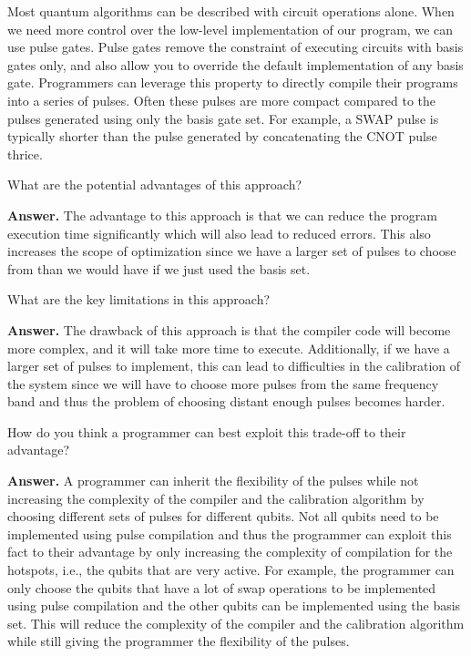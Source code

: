 Most quantum algorithms can be described with circuit operations alone. When we need more control over the low-level implementation of our program, we can use pulse gates. Pulse gates remove the constraint of executing circuits with basis gates only, and also allow you to override the default implementation of any basis gate. Programmers can leverage this property to directly compile their programs into a series of pulses. Often these pulses are more compact compared to the pulses generated using only the basis gate set. For example, a SWAP pulse is typically shorter than the pulse generated by concatenating the CNOT pulse thrice.

\tcbline{}

\begin{question}
    What are the potential advantages of this approach?
\end{question}
\textbf{Answer.} The advantage to this approach is that we can reduce the program execution time significantly which will also lead to reduced errors. This also increases the scope of optimization since we have a larger set of pulses to choose from than we would have if we just used the basis set.

\tcbline{}

\begin{question}
    What are the key limitations in this approach?
\end{question}
\textbf{Answer.} The drawback of this approach is that the compiler code will become more complex, and it will take more time to execute. Additionally, if we have a larger set of pulses to implement, this can lead to difficulties in the calibration of the system since we will have to choose more pulses from the same frequency band and thus the problem of choosing distant enough pulses becomes harder.

\tcbline{}

\begin{question}
    How do you think a programmer can best exploit this trade-off to their advantage?
\end{question}
\textbf{Answer.} A programmer can inherit the flexibility of the pulses while not increasing the complexity of the compiler and the calibration algorithm by choosing different sets of pulses for different qubits. Not all qubits need to be implemented using pulse compilation and thus the programmer can exploit this fact to their advantage by only increasing the complexity of compilation for the hotspots, i.e., the qubits that are very active. For example, the programmer can only choose the qubits that have a lot of swap operations to be implemented using pulse compilation and the other qubits can be implemented using the basis set. This will reduce the complexity of the compiler and the calibration algorithm while still giving the programmer the flexibility of the pulses.

